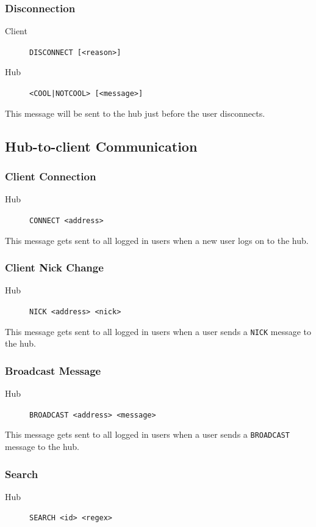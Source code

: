 \documentclass{article}
\begin{document}
\subsubsection{Disconnection}
\begin{description}
\item[Client] \verb+DISCONNECT [<reason>]+
\item[Hub] \verb+<COOL|NOTCOOL> [<message>]+
\end{description}

This message will be sent to the hub just before the user disconnects.

\subsection{Hub-to-client Communication}

\subsubsection{Client Connection}
\begin{description}
\item[Hub] \verb+CONNECT <address>+
\end{description}

This message gets sent to all logged in users when a new user logs on to the hub.

\subsubsection{Client Nick Change}
\begin{description}
\item[Hub] \verb+NICK <address> <nick>+
\end{description}

This message gets sent to all logged in users when a user sends a \verb+NICK+ message to the hub.

\subsubsection{Broadcast Message}
\begin{description}
\item[Hub] \verb+BROADCAST <address> <message>+
\end{description}

This message gets sent to all logged in users when a user sends a \verb+BROADCAST+ message to the hub.

\subsubsection{Search}
\begin{description}
\item[Hub] \verb+SEARCH <id> <regex>+
\end{description}
\end{document}
